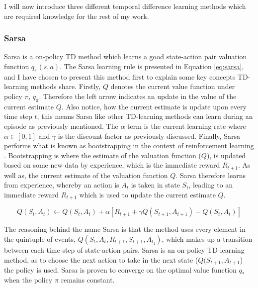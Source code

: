 \documentclass[../dissertation.tex]{subfiles}
\begin{document}
I will now introduce three different temporal difference learning methods which are required knowledge for the rest of my work.

\subsubsection*{Sarsa}

Sarsa is a on-policy TD method which learns a good state-action pair valuation function $q_\pi(s,a)$. The Sarsa learning rule is presented in Equation \ref{eq:sarsa}, and I have chosen to present this method first to explain some key concepts TD-learning methods share. Firstly, $Q$ denotes the current value function under policy $\pi$, $q_\pi$. Therefore the left arrow indicates an update in the value of the current estimate $Q$. Also notice, how the current estimate is update upon every time step $t$, this means Sarsa like other TD-learning methods can learn during an episode as previously mentioned. The $\alpha$ term is the current learning rate where $\alpha \in [0,1]$ and $\gamma$ is the discount factor as previously discussed. Finally, Sarsa performs what is known as bootstrapping in the context of reinforcement learning \cite{sutton2011reinforcement}. Bootstrapping is where the  estimate of the valuation function ($Q$), is updated based on some new data by experience, which is the immediate reward $R_{t+1}$. As well as, the current estimate of the valuation function $Q$. Sarsa therefore learns from experience, whereby an action is $A_t$ is taken in state $S_{t}$, leading to an immediate reward $R_{t+1}$ which is used to update the current estimate $Q$.

\begin{equation}
Q(S_t, A_t) \leftarrow Q(S_t, A_t) + \alpha[R_{t+1} + \gamma Q(S_{t+1}, A_{t+1}) - Q(S_t, A_t)]
\label{eq:sarsa}
\end{equation}

The reasoning behind the name Sarsa is that the method uses every element in the quintuple of events, $Q(S_t, A_t, R_{t+1}, S_{t+1}, A_{t_1})$, which makes up a transition between each time step of state-action pairs. Sarsa is an on-policy TD-learning method, as to choose the next action to take in the next state ($Q(S_{t+1}, A_{t+1}$) the policy is used. Sarsa is proven to converge on the optimal value function $q_*$ when the policy $\pi$ remains constant. \\
\end{document}

